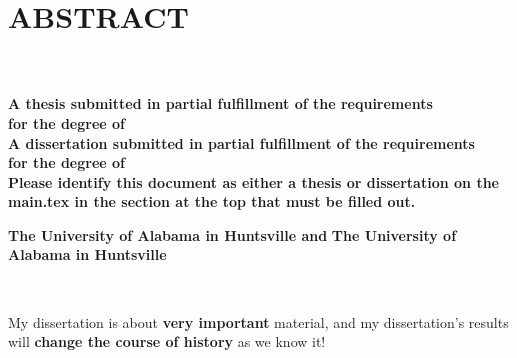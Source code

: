 
\chapter{\texorpdfstring{\MakeUppercase{Abstract}}{Abstract}}
     \begin{center}
        \large
        \singlespacing
        \textbf{\thesistitle}\\
        \vspace{0.5cm}
        \large
        \textbf{\studentname}\\
        \vspace{0.5cm}
        \normalsize
        \ifdefined\thesis
        \textbf{A thesis submitted in partial fulfillment of the requirements \\for the degree of \degree}\\  
        \else
        \ifdefined\dissertation
        \textbf{A dissertation submitted in partial fulfillment of the requirements \\for the degree of \degree}\\ 
        \else
        \textbf{Please identify this document as either a thesis or dissertation on the main.tex in the section at the top that must be filled out.}\\
    \fi
    \fi
        \vspace{1cm}
        \textbf{\department}
        
        \vspace{0.25cm}

        \ifdefined\jointuni
        \textbf{The University of Alabama in Huntsville and  \jointuni}
        \else
        \textbf{The University of Alabama in Huntsville}
    \fi

        
        \vspace{0.1cm}
        \textbf{\gradmonth\ \gradyear}
        


    \end{center}
\vspace{0.1cm}

\doublespacing
My dissertation is about \textbf{very important} material, and my dissertation’s results will \textbf{change the course of history} as we know it!

\clearpage

